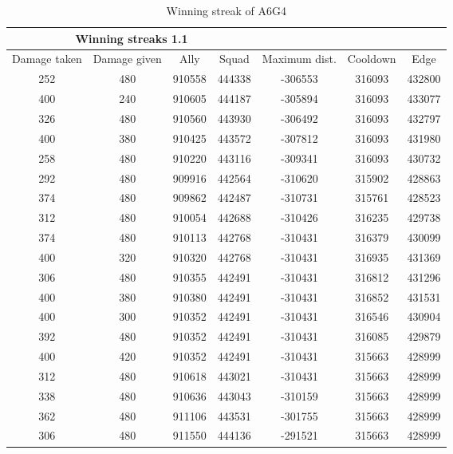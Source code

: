 \newpage
\begin{table}
 \begin{tabular}{|c|c|c|c|c|c|c|}
	\multicolumn{4}{c}{Winning streaks 1.1} \\
	\hline
	Damage taken & Damage given & Ally & Squad & Maximum dist. & Cooldown & Edge \\
	\hline
	
	252&		480&			910558&	444338&	-306553&			316093&	432800\\
	400&		240&			910605&	444187&	-305894&			316093&	433077\\
	326&		480&			910560&	443930&	-306492&			316093&	432797\\
	400&		380&			910425&	443572&	-307812&			316093&	431980\\
	258&		480&			910220&	443116&	-309341&			316093&	430732\\
	292&		480&			909916&	442564&	-310620&			315902&	428863\\
	374&		480&			909862&	442487&	-310731&			315761&	428523\\
	312&		480&			910054&	442688&	-310426&			316235&	429738\\
	374&		480&			910113&	442768&	-310431&			316379&	430099\\
	400&		320&			910320&	442768&	-310431&			316935&	431369\\
	306&		480&			910355&	442491&	-310431&			316812&	431296\\
	400&		380&			910380&	442491&	-310431&			316852&	431531\\
	400&		300&			910352&	442491&	-310431&			316546&	430904\\
	392&		480&			910352&	442491&	-310431&			316085&	429879\\
	400&		420&			910352&	442491&	-310431&			315663&	428999\\
	312&		480&			910618&	443021&	-310431&			315663&	428999\\
	338&		480&			910636&	443043&	-310159&			315663&	428999\\
	362&		480&			911106&	443531&	-301755&			315663&	428999\\
	306&		480&			911550&	444136&	-291521&			315663&	428999\\
	\hline
\end{tabular}
\caption{Winning streak of A6G4}
	\label{winning_streak_2.1}
	\end{table}







